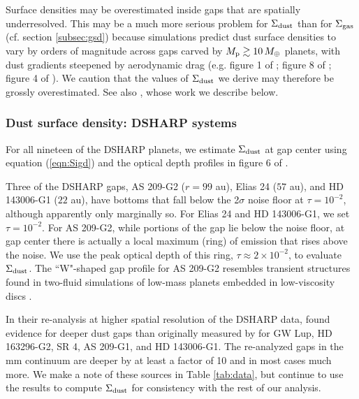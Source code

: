 \documentclass[fleqn,usenatbib]{mnras}
\newcommand{\Sigg}{\Sigma_{\rm gas}}
\newcommand{\Sigd}{\Sigma_{\rm dust}}
\begin{document}
Surface densities may be overestimated inside gaps that are spatially underresolved. This may be a much more serious problem for $\Sigd$ than for $\Sigg$ (cf. section \ref{subsec:gsd}) because simulations predict dust surface densities to vary by orders of magnitude
across gaps carved by $M_{\rm p} \gtrsim 10 \, M_\oplus$ planets, with dust gradients steepened by aerodynamic drag (e.g. figure 1 of \citealt{paardekooper_mellema_2004}; figure 8 of \citealt{dong_etal_2017}; figure 4 of \citealt{binkert_etal_2021}).
We caution that the values of $\Sigd$ we derive may therefore be grossly overestimated. See also \cite{jennings_etal_2021}, whose work we describe below.



\subsubsection{Dust surface density: DSHARP systems}
For all nineteen of the DSHARP planets, we estimate $\Sigd$ at gap center using equation (\ref{eqn:Sigd}) and the optical depth profiles in figure 6 of \cite{huang_etal_2018}.

Three of the DSHARP gaps, AS 209-G2 ($r = 99$ au), Elias 24 ($57$ au), and HD 143006-G1 ($22$ au), have bottoms that fall below the 2$\sigma$ noise floor at $\tau = 10^{-2}$, although apparently only marginally so. For Elias 24 and HD 143006-G1, we set $\tau = 10^{-2}$. For AS 209-G2, while portions of the gap lie below the noise floor, at gap center there is actually a local maximum (ring) of emission that rises above the noise. We use the peak optical depth of this ring, $\tau \approx 2 \times 10^{-2}$, to evaluate $\Sigd$. The ``W"-shaped gap profile
for AS 209-G2 resembles transient structures found in two-fluid simulations of low-mass planets embedded in low-viscosity discs \citep[][]{dong_etal_2017, zhang_etal_2018}.

In their re-analysis at higher spatial resolution of the DSHARP data, \citet[][their figure 12]{jennings_etal_2021} found evidence for deeper dust gaps than originally measured by \cite{huang_etal_2018} for GW Lup, HD 163296-G2, SR 4, AS 209-G1, and HD 143006-G1. The re-analyzed gaps in the mm continuum are deeper by at least a factor of 10 and in most cases much more. We make a note
of these sources in Table \ref{tab:data},
but continue to use the \citet{huang_etal_2018} results to compute $\Sigd$ for consistency with the rest of our analysis.
\end{document}
